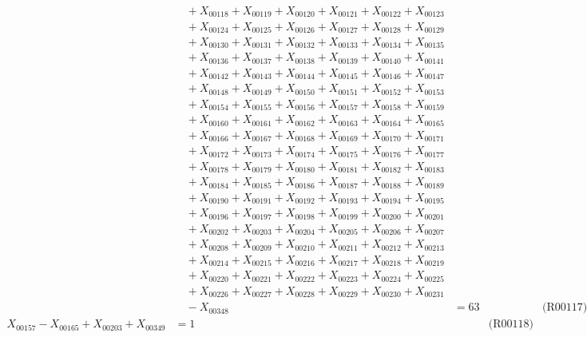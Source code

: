 \documentclass[a4paper,10pt]{article}
\begin{document}
{\begin{align}
&\quad  + X_{00118} + X_{00119} + X_{00120} + X_{00121} + X_{00122} + X_{00123} \\[0.5ex]
&\quad  + X_{00124} + X_{00125} + X_{00126} + X_{00127} + X_{00128} + X_{00129} \\[0.5ex]
&\quad  + X_{00130} + X_{00131} + X_{00132} + X_{00133} + X_{00134} + X_{00135} \\[0.5ex]
&\quad  + X_{00136} + X_{00137} + X_{00138} + X_{00139} + X_{00140} + X_{00141} \\[0.5ex]
&\quad  + X_{00142} + X_{00143} + X_{00144} + X_{00145} + X_{00146} + X_{00147} \\[0.5ex]
&\quad  + X_{00148} + X_{00149} + X_{00150} + X_{00151} + X_{00152} + X_{00153} \\[0.5ex]
&\quad  + X_{00154} + X_{00155} + X_{00156} + X_{00157} + X_{00158} + X_{00159} \\[0.5ex]
&\quad  + X_{00160} + X_{00161} + X_{00162} + X_{00163} + X_{00164} + X_{00165} \\[0.5ex]
&\quad  + X_{00166} + X_{00167} + X_{00168} + X_{00169} + X_{00170} + X_{00171} \\[0.5ex]
&\quad  + X_{00172} + X_{00173} + X_{00174} + X_{00175} + X_{00176} + X_{00177} \\[0.5ex]
&\quad  + X_{00178} + X_{00179} + X_{00180} + X_{00181} + X_{00182} + X_{00183} \\[0.5ex]
&\quad  + X_{00184} + X_{00185} + X_{00186} + X_{00187} + X_{00188} + X_{00189} \\[0.5ex]
&\quad  + X_{00190} + X_{00191} + X_{00192} + X_{00193} + X_{00194} + X_{00195} \\[0.5ex]
&\quad  + X_{00196} + X_{00197} + X_{00198} + X_{00199} + X_{00200} + X_{00201} \\[0.5ex]
&\quad  + X_{00202} + X_{00203} + X_{00204} + X_{00205} + X_{00206} + X_{00207} \\[0.5ex]
&\quad  + X_{00208} + X_{00209} + X_{00210} + X_{00211} + X_{00212} + X_{00213} \\[0.5ex]
&\quad  + X_{00214} + X_{00215} + X_{00216} + X_{00217} + X_{00218} + X_{00219} \\[0.5ex]
&\quad  + X_{00220} + X_{00221} + X_{00222} + X_{00223} + X_{00224} + X_{00225} \\[0.5ex]
&\quad  + X_{00226} + X_{00227} + X_{00228} + X_{00229} + X_{00230} + X_{00231} \\[0.5ex]
&\quad  - X_{00348} &= 63 && \text{(R00117)} \\
X_{00157} - X_{00165} + X_{00203} + X_{00349} &= 1 && \text{(R00118)} \\

\end{align}}
\end{document}

